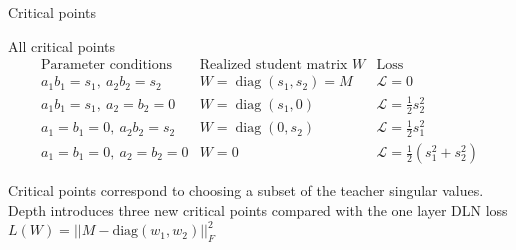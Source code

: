 \documentclass[aspectratio=169,11pt]{beamer}
\begin{document}
\begin{frame}{Critical points}

\begin{block}{All critical points}
\[
\begin{array}{c|c|c}
\text{Parameter conditions}
&
\text{Realized student matrix } W
&
\text{Loss}
\\
\hline
a_1b_1=s_1,\ a_2b_2=s_2
&
W=\operatorname{diag}(s_1,s_2)=M
&
\mathcal L=0
\\[0.4em]
a_1b_1=s_1,\ a_2=b_2=0
&
W=\operatorname{diag}(s_1,0)
&
\mathcal L=\frac12s_2^2
\\[0.4em]
a_1=b_1=0,\ a_2b_2=s_2
&
W=\operatorname{diag}(0,s_2)
&
\mathcal L=\frac12s_1^2
\\[0.4em]
a_1=b_1=0,\ a_2=b_2=0
&
W=0
&
\mathcal L=\frac12(s_1^2+s_2^2)
\end{array}
\]
\end{block}

\centering
\small
Critical points correspond to choosing a subset of the teacher singular values. 
\\
Depth introduces three new critical points compared with the one layer DLN loss $L(W)=||M - \text{diag}(w_1,w_2)||^2_F$ 

\end{frame}
\end{document}
